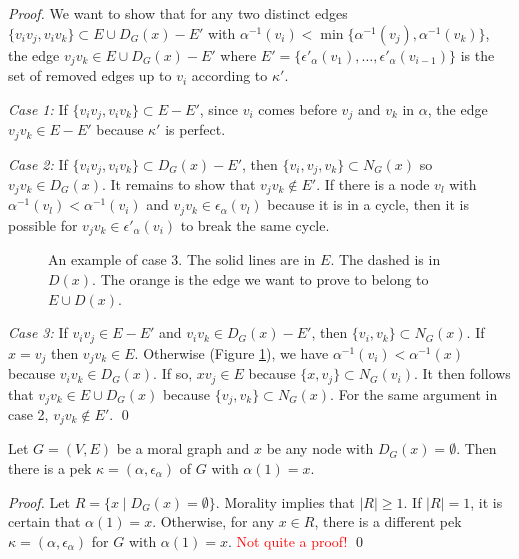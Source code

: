 \begin{proof}
We want to show that for any two distinct edges $\{v_iv_j, v_iv_k\} \subset E\cup D_G(x)-E'$ with $\alpha^{-1}(v_i) < \min \{\alpha^{-1}(v_j), \alpha^{-1}(v_k)\}$, the edge $v_jv_k \in E\cup D_G(x)-E'$ where $E' = \{\epsilon'_{\alpha}(v_1),\dots,\epsilon'_{\alpha}(v_{i-1})\}$ is the set of removed edges up to $v_i$ according to $\kappa'$.

\textit{Case 1:} If $\{v_iv_j, v_iv_k\} \subset E-E'$, since $v_i$ comes before $v_j$ and $v_k$ in $\alpha$, the edge $v_jv_k\in E-E'$ because $\kappa'$ is perfect.

\textit{Case 2:} If $\{v_iv_j, v_iv_k\} \subset D_G(x)-E'$, then $\{v_i,v_j,v_k\} \subset N_G(x)$ so $v_jv_k \in D_G(x)$. It remains to show that $v_jv_k \notin E'$. If there is a node $v_l$ with $\alpha^{-1}(v_l) < \alpha^{-1}(v_i)$ and $v_jv_k\in \epsilon_{\alpha}(v_l)$ because it is in a cycle, then it is possible for $v_jv_k \in \epsilon'_{\alpha}(v_i)$ to break the same cycle. 
\begin{figure}[H]
\centering
{}
\caption{An example of case 3. The solid lines are in $E$. The dashed is in $D(x)$. The orange is the edge we want to prove to belong to $E\cup D(x)$.}
\label{fg:case3}
\end{figure}
\textit{Case 3:} If $v_iv_j \in E-E'$ and $v_iv_k \in D_G(x)-E'$, then $\{v_i,v_k\}\subset N_G(x)$. If $x=v_j$ then $v_jv_k \in E$. Otherwise (Figure \ref{fg:case3}), we have $\alpha^{-1}(v_i) < \alpha^{-1}(x)$ because $v_iv_k \in D_G(x)$. If so, $xv_j \in E$ because $\{x, v_j\} \subset N_G(v_i)$. It then follows that $v_jv_k \in E\cup D_G(x)$ because $\{v_j,v_k\} \subset N_G(x)$. For the same argument in case 2, $v_jv_k \notin E'$. \qed
\end{proof}

\begin{corollary} 
\label{cor:rose_cor2}
Let $G=(V,E)$ be a moral graph and $x$ be any node with $D_G(x)=\emptyset$. Then there is a pek $\kappa=(\alpha,\epsilon_{\alpha})$ of $G$ with $\alpha(1) = x$.
\end{corollary}
\begin{proof}
Let $R=\{x \mid D_G(x)=\emptyset\}$. Morality implies that $|R|\ge 1$. If $|R|=1$, it is certain that $\alpha(1)=x$. Otherwise, for any $x\in R$, there is a different pek $\kappa=(\alpha,\epsilon_{\alpha})$ for $G$ with $\alpha(1)=x$.  \textcolor{red}{Not quite a proof!} \qed
\end{proof}

